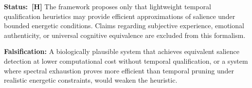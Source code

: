 \begin{constraintboundary}
\textbf{Status:~\textbf{[H]}} The framework proposes only that lightweight temporal
qualification heuristics may provide efficient approximations of salience under
bounded energetic conditions. Claims regarding subjective experience, emotional
authenticity, or universal cognitive equivalence are excluded from this formalism.

\textbf{Falsification:} A biologically plausible system that achieves equivalent
salience detection at lower computational cost without temporal qualification, or
a system where spectral exhaustion proves more efficient than temporal pruning
under realistic energetic constraints, would weaken the heuristic.
\end{constraintboundary}
